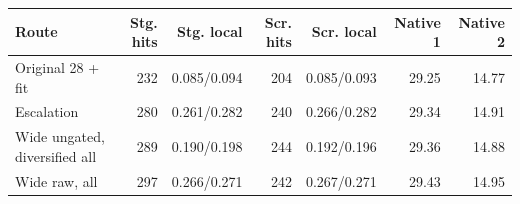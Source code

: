 \begin{tabular}{lrrrrrr}
\toprule
Route & Stg. hits & Stg. local & Scr. hits & Scr. local & Native 1 & Native 2 \\
\midrule
Original 28 + fit & 232 & 0.085/0.094 & 204 & 0.085/0.093 & 29.25 & 14.77 \\
Escalation & 280 & 0.261/0.282 & 240 & 0.266/0.282 & 29.34 & 14.91 \\
Wide ungated, diversified all & 289 & 0.190/0.198 & 244 & 0.192/0.196 & 29.36 & 14.88 \\
Wide raw, all & 297 & 0.266/0.271 & 242 & 0.267/0.271 & 29.43 & 14.95 \\
\bottomrule
\end{tabular}
